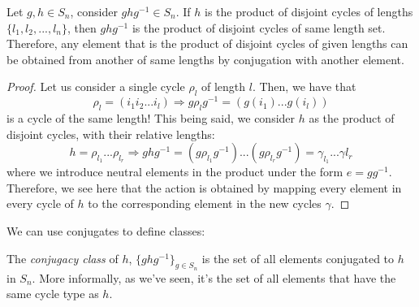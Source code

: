\begin{theorem*}
  Let $g, h \in S_n$, consider $ghg^{-1} \in S_n$. If $h$ is the product of disjoint cycles of lengths $\{l_1, l_2, ..., l_n\}$, then $ghg^{-1}$ is the product of disjoint cycles of same length set. 
  Therefore, any element that is the product of disjoint cycles of given lengths can be obtained from another of same lengths by conjugation with another element.
\end{theorem*}
\begin{proof}
  Let us consider a single cycle $\rho_{l}$ of length $l$. Then, we have that 
  \[
    \rho_l = (i_1i_2...i_l) \Rightarrow g\rho_{l}g^{-1} = (g(i_1)...g(i_l))
  \]
  is a cycle of the same length! This being said, we consider $h$ as the product of disjoint cycles, with their relative lengths: 
  \[
    h = \rho_{l_1}...\rho_{l_r}\Rightarrow ghg^{-1} = (g\rho_{l_1}g^{-1})...(g\rho_{l_r}g^{-1}) = \gamma_{l_1}...\gamma{l_r}
  \]
  where we introduce neutral elements in the product under the form $e = gg^{-1}$. Therefore, we see here that the action is obtained by mapping every element in every cycle of $h$ to the corresponding element in the new cycles $\gamma$. 
\end{proof}

We can use conjugates to define classes: 
\begin{definition}
  The \emph{conjugacy class} of $h$, $\{ghg^{-1}\}_{g \in S_n}$ is the set of all elements conjugated to $h$ in $S_n$. More informally, as we've seen, it's the set of all elements that have the same cycle type as $h$.
\end{definition}


